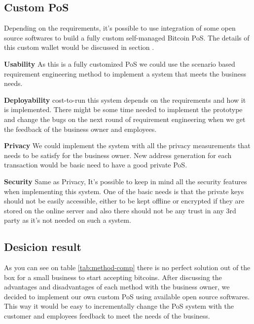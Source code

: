 \subsection{Custom PoS}
Depending on the requirements, it's possible to use integration of some open source softwares to build a fully custom self-managed Bitcoin PoS. The details of this custom wallet would be discussed in section .

 \textbf{Usability}
As this is a fully customized PoS we could use the scenario based requirement engineering method to implement a system that meets the business needs.

 \textbf{Deployability}
cost-to-run this system depends on the requirements and how it is implemented. There might be some time needed to implement the prototype and change the bugs on the next round of requirement engineering when we get the feedback of the business owner and employees.

 \textbf{Privacy}
We could implement the system with all the privacy measurements that needs to be satisfy for the business owner. New address generation for each transaction would be basic need to have a good private PoS.

 \textbf{Security}
Same as Privacy, It's possible to keep in mind all the security features when implementing this system. One of the basic needs is that the private keys should not be easily accessible, either to be kept offline or encrypted if they are stored on the online server and also there should not be any trust in any 3rd party as it's not needed on such a system.

\subsection{Desicion result}
As you can see on table \ref{tab:method-comp} there is no perfect solution out of the box for a small business to start accepting bitcoins. After discussing the advantages and disadvantages of each method with the business owner, we decided to implement our own custom PoS using available open source softwares. This way it would be easy to incrementally change the PoS system with the customer and employees feedback to meet the needs of the business.


